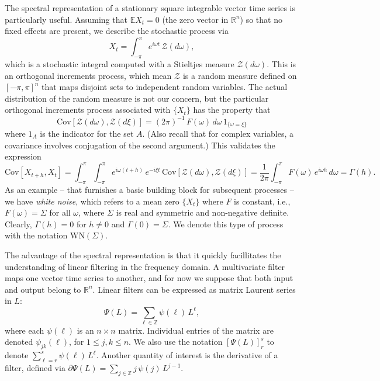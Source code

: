 \documentclass[a4paper]{book}
\def\RR{\mathbb R}
\def\ZZ{\mathbb Z}
\def\EE{\mathbb E}
\begin{document}
 The spectral representation of a stationary square integrable vector 
time series is particularly useful.  Assuming that $\EE X_t = 0$ (the
 zero vector in $\RR^n$) so that no fixed effects are present, we describe
 the stochastic process via
\begin{equation}
\label{eq:specRep}
  X_t = \int_{-\pi}^{\pi} e^{i \omega t} \, \mathcal{Z} (d\omega),
\end{equation}
 which is a stochastic integral computed with a Stieltjes measure
 $\mathcal{Z} (d\omega)$.  This is an orthogonal increments process,
 which mean $\mathcal{Z}$ is a random measure defined on ${[-\pi,\pi]}^n$
 that maps disjoint sets to independent random variables.  The actual
 distribution of the random measure is not our concern, but the particular
 orthogonal increments process associated with $\{ X_t \}$ has the 
 property that
\[
  \mbox{Cov} [ \mathcal{Z} (d\omega), \mathcal{Z} (d\xi) ]
   = {(2 \pi)}^{-1} \, F (\omega) \, d\omega \, 1_{ \{   \omega = \xi \} }
\]
 where $1_A$ is the indicator for the set $A$.
  (Also recall that for complex variables, a 
covariance involves conjugation of
 the second argument.)  This validates the expression
\[
  \mbox{Cov} [ X_{t+h}, X_t ] =
 \int_{-\pi}^{\pi}  \int_{-\pi}^{\pi} e^{i \omega (t+h)} \,
  e^{-i \xi t } \, \mbox{Cov} [ \mathcal{Z} (d\omega), 
  \mathcal{Z} (d\xi) ] 
 =  \frac{1}{2 \pi} \int_{-\pi}^{\pi} F(\omega) \, e^{i \omega h}
  \, d\omega = \Gamma (h).
\]
 As an example -- that furnishes a basic building block for subsequent processes --
 we have {\em white noise}, which refers to a mean zero $\{ X_t \}$ where 
 $F$ is constant, i.e.,
 $F(\omega) = \Sigma$ for all $\omega$, where $\Sigma $ is real and symmetric and
 non-negative definite.  Clearly, $\Gamma (h) = 0$ for $h \neq 0$ and $\Gamma (0) = \Sigma$.
 We denote this type of process with the notation $\mbox{WN} (\Sigma)$.

 The advantage of the spectral representation is that it quickly facillitates
 the understanding of linear filtering in the frequency domain.
 A multivariate filter maps one vector time series to another, and for
 now we suppose that both input and output belong to $\RR^n$.
 Linear filters can be expressed as matrix Laurent series in $L$:
\[
 \Psi (L) = \sum_{\ell \in \ZZ} \psi (\ell) \, L^{\ell},
\]
 where each $\psi (\ell)$ is an $n \times n$ matrix.  
 Individual entries of the matrix are denoted $\psi_{jk} (\ell)$,
 for $1 \leq j, k \leq n$.   We also use the notation
  $ {[\Psi (L) ]}^{s}_r $ to denote $\sum_{\ell=r}^s
  \psi (\ell) \, L^{\ell}$. 
     Another quantity of interest is the derivative of a filter, 
  defined via $\partial \Psi (L) = \sum_{j \in \ZZ} j \, \psi(j) \, L^{j-1}$.
\end{document}
